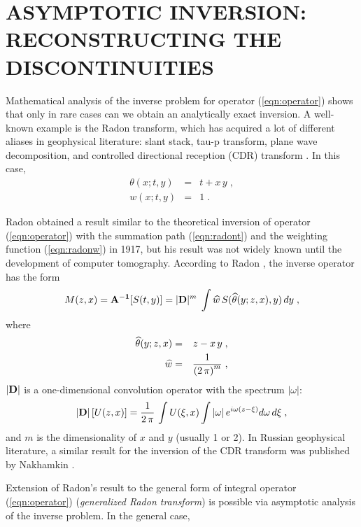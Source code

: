 \section{ASYMPTOTIC INVERSION: RECONSTRUCTING THE DISCONTINUITIES}

Mathematical analysis of the inverse problem for operator
(\ref{eqn:operator}) shows that only in rare cases can we obtain an
analytically exact inversion. A well-known example is the Radon
transform, which has acquired a lot of different aliases in
geophysical literature: slant stack, tau-p transform, plane wave
decomposition, and controlled directional reception (CDR) transform
\cite[]{slant}. In this case,
\begin{eqnarray}
\theta(x;t,y) & = & t+x\,y\;,
\label{eqn:radont}\\
 w(x;t,y) & = & 1\;.
\label{eqn:radonw}
\end{eqnarray} 
\par
Radon obtained a result similar to the theoretical inversion of
operator (\ref{eqn:operator}) with the summation path
(\ref{eqn:radont}) and the weighting function (\ref{eqn:radonw}) in
1917, but his result was not widely known until the development of
computer tomography. According to Radon , the inverse
operator has the form
\begin{equation}
M(z,x) ={\bf A^{-1}}[S(t,y)]= |{\bf D}|^m\;\int
\widehat{w}\,S(\widehat{\theta}(y;z,x),y)\,dy\;,
\label{eqn:radon}
\end{equation}
where 
\begin{eqnarray}
\widehat{\theta}(y;z,x) & = & z-x\,y\;,
\\
\widehat{w}  & = & {1\over {\left(2\,\pi\right)^m}}\;,
\end{eqnarray} 
$|{\bf D}|$ is a one-dimensional convolution operator with the
spectrum $|\omega|$:
\begin{equation}
  \label{eq:rho}
  |{\bf D}| \left[U(z,x)\right] = \frac{1}{2\,\pi}\,
  \int U(\xi,x) \int |\omega|\,e^{i \omega (z-\xi)} d \omega \, d \xi\;,
\end{equation}
 and $m$ is the dimensionality of $x$ and $y$
(usually 1 or 2).  In Russian geophysical literature, a similar result
for the inversion of the CDR transform was published by Nakhamkin
.
\par
Extension of Radon's result to the general form of integral operator
(\ref{eqn:operator}) ({\em generalized Radon transform}) is possible
via asymptotic analysis of the inverse problem. In the general case,
